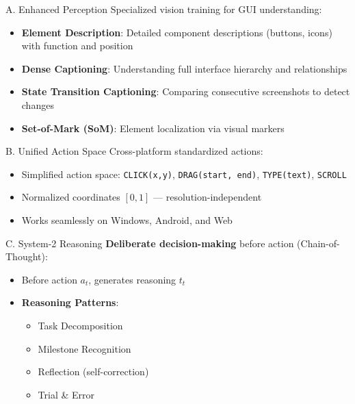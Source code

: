 \begin{frame}{A. Enhanced Perception}
  Specialized vision training for GUI understanding:
  \begin{itemize}
    \item \textbf{Element Description}: Detailed component descriptions (buttons, icons) with function and position
    \item \textbf{Dense Captioning}: Understanding full interface hierarchy and relationships
    \item \textbf{State Transition Captioning}: Comparing consecutive screenshots to detect changes
    \item \textbf{Set-of-Mark (SoM)}: Element localization via visual markers
  \end{itemize}
\end{frame}

\begin{frame}{B. Unified Action Space}
  Cross-platform standardized actions:
  \begin{itemize}
    \item Simplified action space: \texttt{CLICK(x,y)}, \texttt{DRAG(start, end)}, \texttt{TYPE(text)}, \texttt{SCROLL}
    \item Normalized coordinates $[0,1]$ — resolution-independent
    \item Works seamlessly on Windows, Android, and Web
  \end{itemize}
\end{frame}

\begin{frame}{C. System-2 Reasoning}
  \textbf{Deliberate decision-making} before action (Chain-of-Thought):
  \begin{itemize}
    \item Before action $a_t$, generates reasoning $t_t$
    \item \textbf{Reasoning Patterns}:
      \begin{itemize}
        \item Task Decomposition
        \item Milestone Recognition
        \item Reflection (self-correction)
        \item Trial \& Error
      \end{itemize}
  \end{itemize}
\end{frame}


